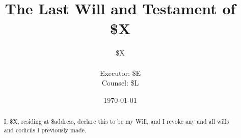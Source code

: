 \title{The Last Will and Testament of \\ 
    \$X
}

\author{
\$X
\\
\\
Executor: \$E
\\
Counsel: \$L
\\
}

\date{\today}

\maketitle

\begin{abstract}
    
    I, \$X, residing at \$address, declare this to be my Will, and I revoke any and all wills and codicils I previously made.

\end{abstract}